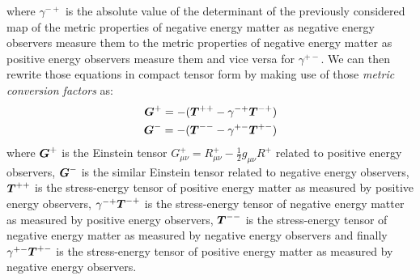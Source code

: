 \documentclass[notitlepage,12pt]{report}
\newcommand{\bm}[1]{\mbox{\boldmath $#1$}}
\begin{document}
where $\gamma^{-+}$ is the absolute value of the determinant of the previously considered map of the metric properties of negative energy matter as negative energy observers measure them to the metric properties of negative energy matter as positive energy observers measure them and vice versa for $\gamma^{+-}$. We can then rewrite those equations in compact tensor form by making use of those \textit{metric conversion factors} as:
\begin{eqnarray}\label{eq:2.6}
\bm{G}^+=-(\bm{T}^{++}-\gamma^{-+}\bm{T}^{-+}) \\
\bm{G}^-=-(\bm{T}^{--}-\gamma^{+-}\bm{T}^{+-}) \nonumber
\end{eqnarray}
where $\bm{G}^+$ is the Einstein tensor $G^+_{\mu\nu}=R^+_{\mu\nu}-\frac{1}{2}g_{\mu\nu}R^+$ related to positive energy observers, $\bm{G}^-$ is the similar Einstein tensor related to negative energy observers, $\bm{T}^{++}$ is the stress-energy tensor of positive energy matter as measured by positive energy observers, $\gamma^{-+}\bm{T}^{-+}$ is the stress-energy tensor of negative energy matter as measured by positive energy observers, $\bm{T}^{--}$ is the stress-energy tensor of negative energy matter as measured by negative energy observers and finally $\gamma^{+-}\bm{T}^{+-}$ is the stress-energy tensor of positive energy matter as measured by negative energy observers.
\end{document}
